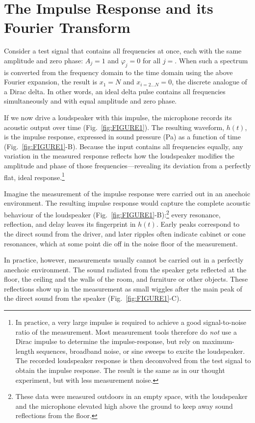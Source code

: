 \documentclass[12pt,a4paper]{article}
\providecommand{\seclabel}[1]{\label{sec:#1}}
\providecommand{\figr}[1]{Fig.~\ref{fig:#1}}
\begin{document}
\section{The Impulse Response and its Fourier Transform}\seclabel{impulse_response}

Consider a test signal that contains all frequencies at once, each with the same amplitude and zero phase: $A_j = 1$ and $\varphi_j = 0$ for all $j =$. When such a spectrum is converted from the frequency domain to the time domain using the above Fourier expansion, the result is $x_1 = N$ and $x_{i=2\ldots N} = 0$, the discrete analogue of a Dirac delta. In other words, an ideal delta pulse contains all frequencies simultaneously and with equal amplitude and zero phase.

If we now drive a loudspeaker with this impulse, the microphone records its acoustic output over time (\figr{FIGURE1}).  
The resulting waveform, $h(t)$, is the impulse response, expressed in sound pressure (Pa) as a function of time (\mbox{\figr{FIGURE1}-B}). Because the input contains all frequencies equally, any variation in the measured response reflects how the loudspeaker modifies the amplitude and phase of those frequencies—revealing its deviation from a perfectly flat, ideal response.\footnote{In practice, a very large impulse is required to achieve a good signal-to-noise ratio of the measurement. Most measurement tools therefore do \emph{not} use a Dirac impulse to determine the impulse-response, but rely on maximum-length sequences, broadband noise, or sine sweeps to excite the loudspeaker. The recorded loudspeaker response is then deconvolved from the test signal to obtain the impulse response. The result is the same as in our thought experiment, but with less measurement noise.}

Imagine the measurement of the impulse response were carried out in an anechoic environment. The resulting impulse response would capture the complete acoustic behaviour of the loudspeaker (\mbox{\figr{FIGURE1}-B}):\footnote{These data were measured outdoors in an empty space, with the loudspeaker and the microphone elevated high above the ground to keep away sound reflections from the floor.} every resonance, reflection, and delay leaves its fingerprint in $h(t)$. Early peaks correspond to the direct sound from the driver, and later ripples often indicate cabinet or cone resonances, which at some point die off in the noise floor of the measurement.

In practice, however, measurements usually cannot be carried out in a perfectly anechoic environment. The sound radiated from the speaker gets reflected at the floor, the ceiling and the walls of the room, and furniture or other objects. These reflections show up in the measurement as small wiggles after the main peak of the direct sound from the speaker (\figr{FIGURE1}-C).
\end{document}
